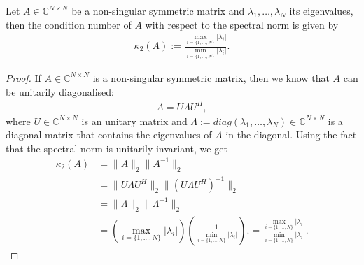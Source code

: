     	\begin{theorem}\label{theorem:ConditionNumberEigenvalue}
    	    Let $A \in \mathbb{C}^{N \times N}$ be a non-singular symmetric matrix and $\lambda_1, \dots, \lambda_N$ its eigenvalues, then the condition number of $A$ with respect to the spectral norm is given by
    	    \begin{align*}
    	        \kappa_2(A) := \frac{\max_{i = \{1, \dots, N \} } | \lambda_i |}{\min_{i = \{1, \dots, N \} } | \lambda_i |}.
    	    \end{align*}
    	\end{theorem}
    	
    	\begin{proof}
    	    If $A \in \mathbb{C}^{N \times N}$ is a non-singular symmetric matrix, then we know that $A$ can be unitarily diagonalised:
    	    \begin{align*}
    	        A = U \Lambda U^H,
    	    \end{align*}
    	    where $U \in \mathbb{C}^{N \times N}$ is an unitary matrix and $\Lambda := diag(\lambda_1, \dots, \lambda_N) \in \mathbb{C}^{N \times N}$ is a diagonal matrix that contains the eigenvalues of $A$ in the diagonal. Using the fact that the spectral norm is unitarily invariant, we get
    	    \begin{align*}
    	        \kappa_2(A) &= \| A \|_2 \| A^{-1} \|_2 \\
    	        &= \| U \Lambda U^H \|_2 \| (U \Lambda U^H)^{-1} \|_2 \\
    	        &= \| \Lambda \|_2 \| \Lambda^{-1} \|_2 \\
    	        &= \left( \max_{i = \{1, \dots, N \} } | \lambda_i | \right) \left( \frac{1}{\min_{i = \{1, \dots, N \} } | \lambda_i |} \right). = \frac{\max_{i = \{1, \dots, N \} } | \lambda_i |}{\min_{i = \{1, \dots, N \} } | \lambda_i |}.
    	    \end{align*}
    	\end{proof}
    	
